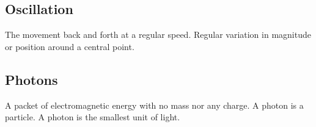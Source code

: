 \documentclass{article}
\begin{document}
\subsection{Oscillation}\label{sec:oscillation}
The movement back and forth at a regular speed. Regular variation in magnitude or position around a central point.

\subsection{Photons}\label{sec:photons}
A packet of electromagnetic energy with no mass nor any charge. A photon is a particle. A photon is the smallest unit of light.
\end{document}
